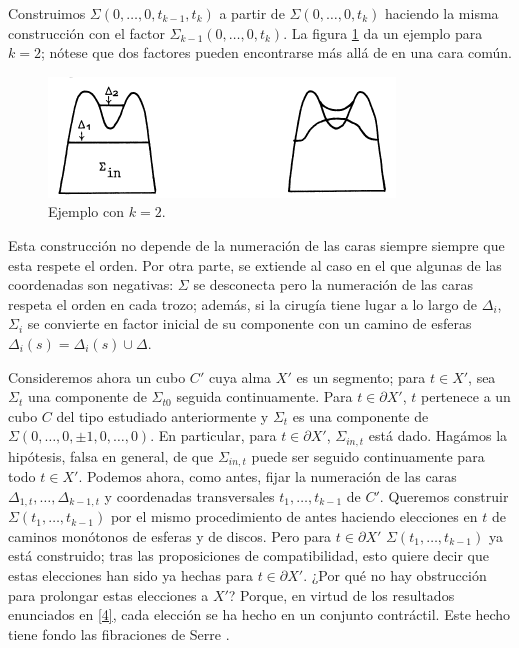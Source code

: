 \documentclass[twoside, 11pt]{article}
\begin{document}
Construimos $\Sigma(0,\dots,0,t_{k-1},t_k)$ a partir de $\Sigma(0,\dots,0,t_k)$ haciendo la misma construcción con el factor $\Sigma_{k-1}(0,\dots,0,t_k)$. La figura \ref{construccion} da un ejemplo para $k=2$; nótese que dos factores pueden encontrarse más allá de en una cara común.

\begin{figure}[h!]
\includegraphics[scale=0.8]{construccion}
\caption{Ejemplo con $k=2$.}\label{construccion}
\end{figure}

Esta construcción no depende de la numeración de las caras siempre siempre que esta respete el orden. Por otra parte, se extiende al caso en el que algunas de las coordenadas son negativas: $\Sigma$ se desconecta pero la numeración de las caras respeta el orden en cada trozo; además, si la cirugía tiene lugar a lo largo de $\Delta_i$, $\Sigma_i$ se convierte en factor inicial de su componente con un camino de esferas $\Delta_i(s)=\Delta_i(s)\cup\Delta$. 

Consideremos ahora un cubo $C'$ cuya alma $X'$ es un segmento; para $t\in X'$, sea $\Sigma_t$ una componente de $\Sigma_{t0}$ seguida continuamente. Para $t\in\partial X'$, $t$ pertenece a un cubo $C$ del tipo estudiado anteriormente y $\Sigma_t$ es una componente de $\Sigma(0,\dots, 0,\pm 1,0,\dots, 0)$. En particular, para $t\in\partial X'$, $\Sigma_{in,t}$ está dado. Hagámos la hipótesis, falsa en general, de que $\Sigma_{in,t}$ puede ser seguido continuamente para todo $t\in X'$. Podemos ahora, como antes, fijar la numeración de las caras $\Delta_{1,t},\dots, \Delta_{k-1,t}$ y coordenadas transversales $t_1,\dots, t_{k-1}$ de $C'$. Queremos construir $\Sigma(t_1,\dots, t_{k-1})$ por el mismo procedimiento de antes haciendo elecciones en $t$ de caminos monótonos de esferas y de discos. Pero para $t\in\partial X'$ $\Sigma(t_1,\dots, t_{k-1})$ ya está construido; tras las proposiciones de compatibilidad, esto quiere decir que estas elecciones han sido ya hechas para $t\in \partial X'$. ¿Por qué no hay obstrucción para prolongar estas elecciones a $X'$? Porque, en virtud de los resultados enunciados en \ref{4}, cada elección se ha hecho en un conjunto contráctil. Este hecho tiene fondo las fibraciones de Serre \cite{Se}.
\end{document}
